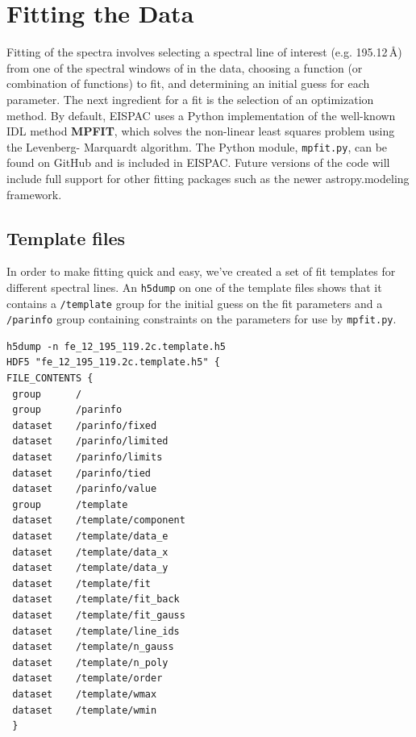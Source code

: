 
\chapter{Fitting the Data}

Fitting of the spectra involves selecting a spectral line of interest (e.g.  195.12\,\AA)
from one of the spectral windows of in the data, choosing a function (or combination of functions) to
fit, and determining an initial guess for each parameter. The next ingredient for a fit is the
selection of an optimization method. By default, EISPAC uses a Python implementation of the well-known
IDL method \textbf{MPFIT}, which solves the non-linear least squares problem using the Levenberg-
Marquardt algorithm. The Python module, \verb+mpfit.py+, can be found on GitHub and is included in EISPAC. Future versions of the code will include
full support for other fitting packages such as the newer astropy.modeling framework.

\section{Template files}
In order to make fitting quick and easy, we've created a set of fit templates for different spectral lines. An \verb+h5dump+ on one of the template files shows that it contains a \verb+/template+ group for the initial guess on the fit parameters and a \verb+/parinfo+ group containing constraints on the parameters for use by \verb+mpfit.py+.

\begin{lstlisting}
h5dump -n fe_12_195_119.2c.template.h5
HDF5 "fe_12_195_119.2c.template.h5" {
FILE_CONTENTS {
 group      /
 group      /parinfo
 dataset    /parinfo/fixed
 dataset    /parinfo/limited
 dataset    /parinfo/limits
 dataset    /parinfo/tied
 dataset    /parinfo/value
 group      /template
 dataset    /template/component
 dataset    /template/data_e
 dataset    /template/data_x
 dataset    /template/data_y
 dataset    /template/fit
 dataset    /template/fit_back
 dataset    /template/fit_gauss
 dataset    /template/line_ids
 dataset    /template/n_gauss
 dataset    /template/n_poly
 dataset    /template/order
 dataset    /template/wmax
 dataset    /template/wmin
 }
\end{lstlisting}

